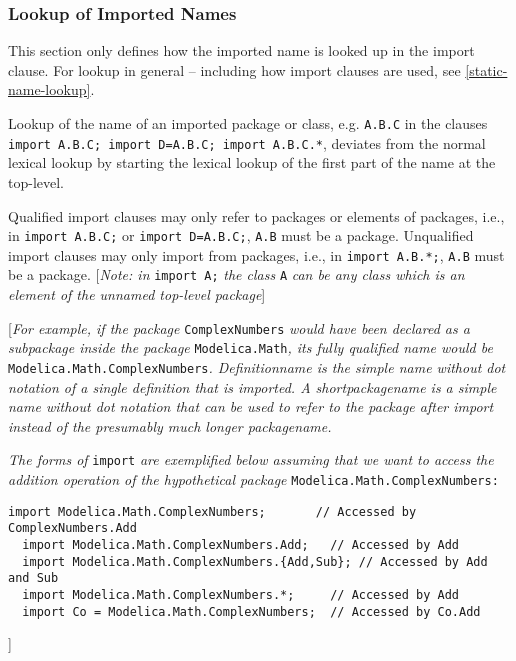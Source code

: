 \subsubsection{Lookup of Imported Names}

This section only defines how the imported name is looked up in the
import clause. For lookup in general -- including how import clauses are
used, see \autoref{static-name-lookup}.

Lookup of the name of an imported package or class, e.g. \lstinline!A.B.C! in the
clauses \lstinline!import A.B.C; import D=A.B.C; import A.B.C.*!, deviates from the
normal lexical lookup by starting the lexical lookup of the first part
of the name at the top-level.

Qualified import clauses may only refer to packages or elements of
packages, i.e., in \lstinline!import A.B.C;! or \lstinline!import D=A.B.C;!,
\lstinline!A.B! must be a
package. Unqualified import clauses may only import from packages, i.e.,
in \lstinline!import A.B.*;!, \lstinline!A.B! must be a package. {[}\emph{Note: in} \lstinline!import A;!
\emph{the class} \lstinline!A! \emph{can be any class which is an element of the
unnamed top-level package}{]}

{[}\emph{For example, if the package} \lstinline!ComplexNumbers! \emph{would have
been declared as a subpackage inside the package} \lstinline!Modelica.Math!\emph{,
its fully qualified name would be} \lstinline!Modelica.Math.ComplexNumbers!\emph{.
Definitionname is the simple name without dot notation of a single
definition that is imported. A shortpackagename is a simple name without
dot notation that can be used to refer to the package after import
instead of the presumably much longer packagename.}


\emph{The forms of} \lstinline!import! \emph{are exemplified below assuming that we want to
access the addition operation of the hypothetical package}
\lstinline!Modelica.Math.ComplexNumbers:!

\begin{lstlisting}[language=modelica]
  import Modelica.Math.ComplexNumbers;       // Accessed by ComplexNumbers.Add
  import Modelica.Math.ComplexNumbers.Add;   // Accessed by Add
  import Modelica.Math.ComplexNumbers.{Add,Sub}; // Accessed by Add and Sub
  import Modelica.Math.ComplexNumbers.*;     // Accessed by Add
  import Co = Modelica.Math.ComplexNumbers;  // Accessed by Co.Add
\end{lstlisting}
{]}

